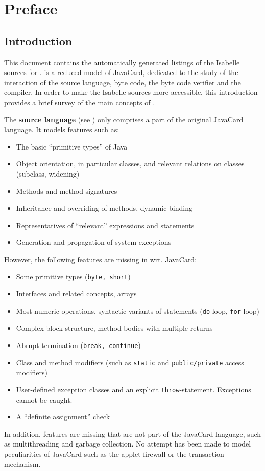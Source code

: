 \chapter{Preface}

\section{Introduction}
\label{sec:introduction}

This document contains the automatically generated listings of the
Isabelle sources for \mJava. \mJava{} is a reduced model of JavaCard,
dedicated to the study of the interaction of the source language, byte
code, the byte code verifier and the compiler. In order to make the
Isabelle sources more accessible, this introduction provides a brief
survey of the main concepts of \mJava.

The \mJava{} \textbf{source language} (see )
only comprises a part of the original JavaCard language. It models
features such as:
\begin{itemize}
\item The basic ``primitive types'' of Java 
\item Object orientation, in particular classes, and relevant
  relations on classes (subclass, widening)

\item Methods and method signatures
\item Inheritance and overriding of methods, dynamic binding

\item Representatives of ``relevant'' expressions and statements 
\item Generation and propagation of system exceptions
\end{itemize}

However, the following features are missing in \mJava{} wrt.{} JavaCard:
\begin{itemize}
\item Some primitive types (\texttt{byte, short})
\item Interfaces and related concepts, arrays
\item Most numeric operations, syntactic variants of statements
  (\texttt{do}-loop, \texttt{for}-loop)
\item Complex block structure, method bodies with multiple returns
\item Abrupt termination (\texttt{break, continue})
\item Class and method modifiers (such as \texttt{static} and
  \texttt{public/private} access modifiers)
\item User-defined exception classes and an explicit
  \texttt{throw}-statement. Exceptions cannot be caught.
\item A ``definite assignment'' check
\end{itemize}
In addition, features are missing that are not part of the JavaCard
language, such as multithreading and garbage collection. No attempt
has been made to model peculiarities of JavaCard such as the applet
firewall or the transaction mechanism.

